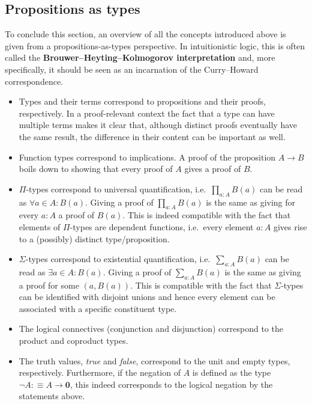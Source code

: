 \subsection{Propositions as types}

    To conclude this section, an overview of all the concepts introduced above is given from a propositions-as-types perspective. In intuitionistic logic, this is often called the \textbf{Brouwer--Heyting--Kolmogorov interpretation} and, more specifically, it should be seen as an incarnation of the Curry--Howard correspondence.

    \begin{itemize}
        \item Types and their terms correspond to propositions and their proofs, respectively. In a proof-relevant context the fact that a type can have multiple terms makes it clear that, although distinct proofs eventually have the same result, the difference in their content can be important as well.
        \item Function types correspond to implications. A proof of the proposition $A\rightarrow B$ boils down to showing that every proof of $A$ gives a proof of $B$.
        \item $\Pi$-types correspond to universal quantification, i.e.~$\prod_{a:A}B(a)$ can be read as $\forall a\in A: B(a)$. Giving a proof of $\prod_{a:A}B(a)$ is the same as giving for every $a:A$ a proof of $B(a)$. This is indeed compatible with the fact that elements of $\Pi$-types are dependent functions, i.e.~every element $a:A$ gives rise to a (possibly) distinct type/proposition.
        \item $\Sigma$-types correspond to existential quantification, i.e.~$\sum_{a:A}B(a)$ can be read as $\exists a\in A:B(a)$. Giving a proof of $\sum_{a:A}B(a)$ is the same as giving a proof for some $(a, B(a))$. This is compatible with the fact that $\Sigma$-types can be identified with disjoint unions and hence every element can be associated with a specific constituent type.
        \item The logical connectives (conjunction and disjunction) correspond to the product and coproduct types.
        \item The truth values, \textit{true} and \textit{false}, correspond to the unit and empty types, respectively. Furthermore, if the negation of $A$ is defined as the type $\lnot A:\equiv A\rightarrow\symbf{0}$, this indeed corresponds to the logical negation by the statements above.
    \end{itemize}

